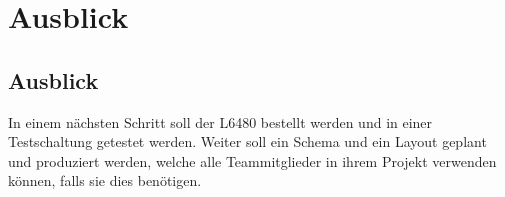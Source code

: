 \ifSTANDALONE
\section{Ausblick}
\fi
\ifEMBED
\subsection{Ausblick}
\fi
	In einem nächsten Schritt soll der L6480 bestellt werden und in einer Testschaltung getestet werden. Weiter soll ein Schema und ein Layout geplant und produziert werden, welche alle Teammitglieder in ihrem Projekt verwenden können, falls sie dies benötigen. 